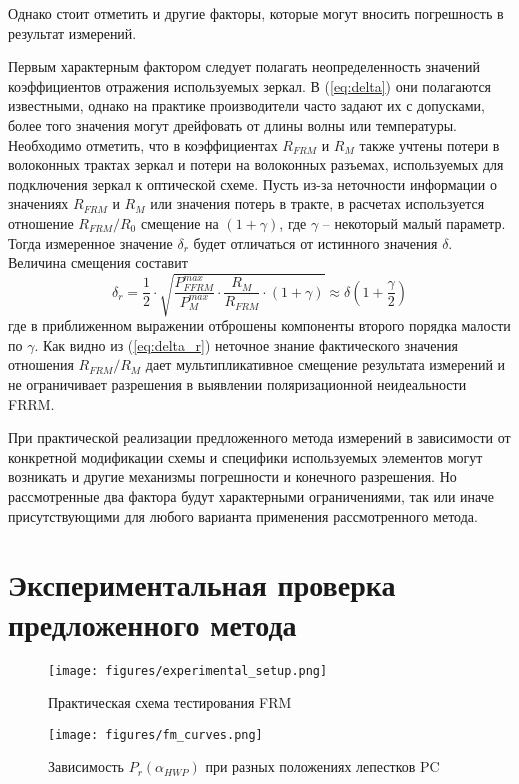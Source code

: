 \documentclass{article}
\begin{document}
Однако стоит отметить и другие факторы, которые могут вносить погрешность в результат измерений.   

Первым характерным фактором следует полагать неопределенность значений коэффициентов отражения используемых зеркал.
В (\ref{eq:delta}) они полагаются известными, однако на практике производители часто задают их с допусками, более того значения могут дрейфовать от длины волны или температуры.
Необходимо отметить, что в коэффициентах $R_{FRM}$ и $R_M$ также учтены потери в волоконных трактах зеркал и потери на волоконных разъемах, используемых для подключения зеркал к оптической схеме.
Пусть из-за неточности информации о значениях $R_{FRM}$ и $R_M$ или значения потерь в тракте, в расчетах используется отношение $R_{FRM}/R_0$ смещение на $(1+\gamma)$, где $\gamma$ – некоторый малый параметр. Тогда измеренное значение $\delta_r$ будет отличаться от истинного значения $\delta$. Величина смещения составит    
\begin{equation}
    \label{eq:delta_r}
    \delta_r=\frac{1}{2}\cdot\sqrt{\frac{P_{FFRM}^{max}}{P_M^{max}}\cdot\frac{R_M}{R_{FRM}}\cdot(1+\gamma)}\approx\delta\left( 1+\frac{\gamma}{2} \right)
\end{equation}
где в приближенном выражении отброшены компоненты второго порядка малости по $\gamma$.
Как видно из (\ref{eq:delta_r}) неточное знание фактического значения отношения $R_{FRM}/R_M$ дает мультипликативное смещение результата измерений и не ограничивает разрешения в выявлении поляризационной неидеальности FRRM.



При практической реализации предложенного метода измерений в зависимости от конкретной модификации схемы и специфики используемых элементов могут возникать и другие механизмы погрешности и конечного разрешения.
Но рассмотренные два фактора будут характерными ограничениями, так или иначе присутствующими для любого варианта применения рассмотренного метода.   


\section{Экспериментальная проверка предложенного метода}
\begin{figure}[b]
	\centering
	\texttt{[image: figures/experimental\_setup.png]}
	\caption{Практическая схема тестирования FRM}
	\label{fig:experimantalScheme}
\end{figure}

\begin{figure}[b]
	\centering
	\texttt{[image: figures/fm\_curves.png]}
	\caption{Зависимость $P_r(\alpha_{HWP})$ при разных положениях лепестков PC}
	\label{fig:fm_curves}
\end{figure}
\end{document}
